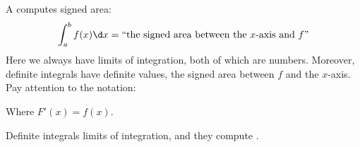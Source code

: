 \documentclass{ximera}
\begin{document}
A  computes signed area:
\[
\int_a^b f(x) \d x = ``\text{the signed area between the $x$-axis and $f$''}
\]
Here we always have limits of integration, both of which are
numbers. Moreover, definite integrals have definite values, the signed
area between $f$ and the $x$-axis. Pay attention to the notation:
\begin{image}
\end{image}
Where $F'(x) = f(x)$.
\begin{explanation}%
  Definite integrals  limits of integration, and they compute
  .
\end{explanation}
\end{document}
